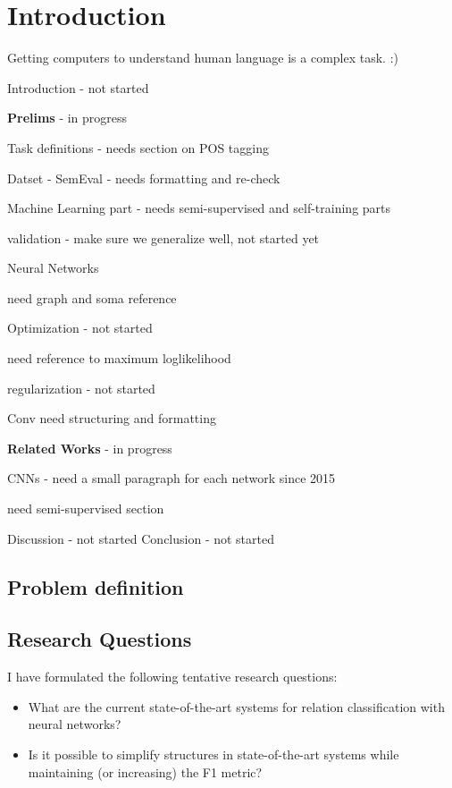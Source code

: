 \chapter{Introduction}

Getting computers to understand human language is a complex task. :)

Introduction - not started

\textbf{Prelims} - in progress

Task definitions - needs section on POS tagging

Datset -
SemEval - needs formatting and re-check  

Machine Learning part - needs semi-supervised and self-training parts

validation - make sure we generalize well, not started yet

Neural Networks

need graph and soma reference



Optimization - not started

need reference to maximum loglikelihood

regularization - not started


Conv need structuring and formatting


\textbf{Related Works} - in progress
    
    CNNs - need a small paragraph for each network since 2015

need semi-supervised section


Discussion - not started
Conclusion - not started


\section{Problem definition}


\section{Research Questions}

I have formulated the following tentative research questions:
\begin{itemize}
    \item What are the current state-of-the-art systems for relation classification 
    with neural networks?\\
    \item Is it possible to simplify structures in state-of-the-art systems while maintaining (or increasing) the F1 metric?\label{research_q:simplify}
\end{itemize}




